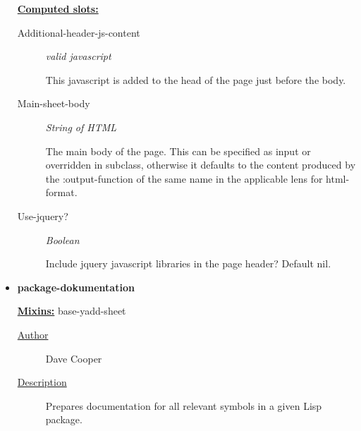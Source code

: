 \documentclass [11pt]{book}
\begin{document}
\begin{itemize}
\textbf{
\underline{Computed slots:}}

\begin{description}

\item [Additional-header-js-content]
\emph{valid javascript}

 This javascript is added to the head of the page just before the body.


\item [Main-sheet-body]
\emph{String of HTML}

 The main body of the page.
This can be specified as input or overridden in subclass, otherwise it defaults
to the content produced by the :output-function of the same name
in the applicable lens for  html-format.




\item [Use-jquery?]
\emph{Boolean}

 Include jquery javascript libraries in the page header?
Default nil.




\end{description}







\item {}
\label{prim:package-dokumentation}
\textbf{package-dokumentation}


\textbf{
\underline{Mixins:}} base-yadd-sheet





\begin{description}

\item [
\underline{Author}]


Dave Cooper



\item [
\underline{Description}]


Prepares documentation for all relevant symbols in a given Lisp package.



\end{description}









\end{itemize}
\end{document}
